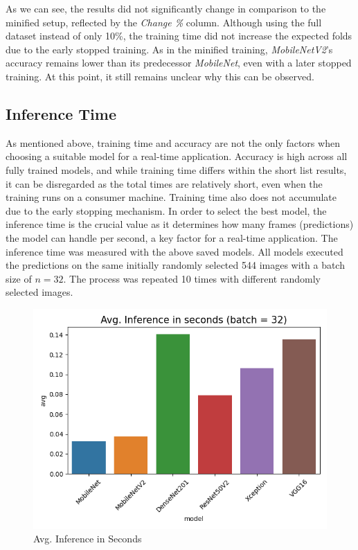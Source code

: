 As we can see, the results did not significantly change in comparison to the minified setup, reflected by the \textit{Change \%} column. Although using the full dataset instead of only 10\%, the training time did not increase the expected folds due to the early stopped training. As in the minified training, \textit{MobileNetV2}'s accuracy remains lower than its predecessor \textit{MobileNet}, even with a later stopped training. At this point, it still remains unclear why this can be observed.

\subsection{Inference Time}
As mentioned above, training time and accuracy are not the only factors when choosing a suitable model for a real-time application. Accuracy is high across all fully trained models, and while training time differs within the short list results, it can be disregarded as the total times are relatively short, even when the training runs on a consumer machine. Training time also does not accumulate due to the early stopping mechanism. In order to select the best model, the inference time is the crucial value as it determines how many frames (predictions) the model can handle per second, a key factor for a real-time application.
The inference time was measured with the above saved models. All models executed the predictions on the same initially randomly selected 544 images with a batch size of \begin{math}n=32\end{math}. The process was repeated 10 times with different randomly selected images.

\begin{figure}[h]
    \centering
    \caption{Avg. Inference in Seconds}
	\label{fig:result:inference}
    \includegraphics[width=\linewidth]{figures/inference.png}
\end{figure}

